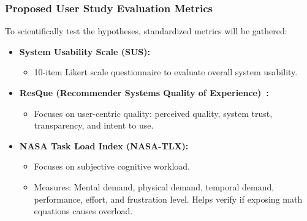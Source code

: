 \begin{frame}
    \frametitle{Proposed User Study Evaluation Metrics}
    To scientifically test the hypotheses, standardized metrics will be gathered:
    \begin{itemize}
        \item \textbf{System Usability Scale (SUS):}
            \begin{itemize}
                \item 10-item Likert scale questionnaire to evaluate overall system usability.
            \end{itemize}
        \item \textbf{ResQue (Recommender Systems Quality of Experience)~\cite{knijnenburg2012explaining}:}
            \begin{itemize}
                \item Focuses on user-centric quality: perceived quality, system trust, transparency, and intent to use.
            \end{itemize}
        \item \textbf{NASA Task Load Index (NASA-TLX):}
            \begin{itemize}
                \item Focuses on subjective cognitive workload.
                \item Measures: Mental demand, physical demand, temporal demand, performance, effort, and frustration level. Helps verify if exposing math equations causes overload.
            \end{itemize}
    \end{itemize}
\end{frame}

